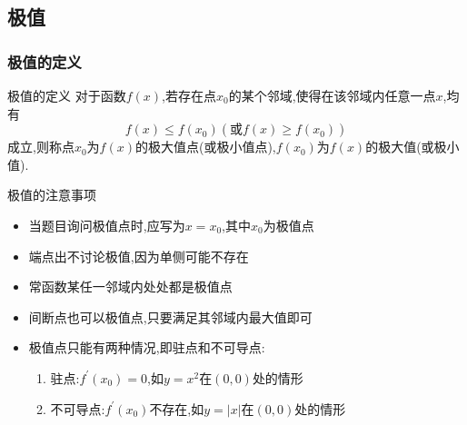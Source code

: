 \documentclass[8pt a4paper, oneside, UTF8]{ctexbook}  %
\begin{document}
\begin{sloppypar}
    \subsection{极值}
    \subsubsection{极值的定义}
    \begin{defn}{极值的定义}{}
        对于函数$f(x)$,若存在点$x_0$的某个邻域,使得在该邻域内任意一点$x$,均有
        $$
            f(x)\leqslant f(x_0)(\text{或}f(x)\geqslant f(x_0))
        $$
        成立,则称点$x_0$为$f(x)$的极大值点(或极小值点),$f(x_0)$为$f(x)$的极大值(或极小值).
    \end{defn}
    \begin{criterion}{极值的注意事项}{}
        \begin{itemize}
            \item 当题目询问极值点时,应写为$x=x_0$,其中$x_0$为极值点
            \item 端点出不讨论极值,因为单侧可能不存在
            \item 常函数某任一邻域内处处都是极值点
            \item 间断点也可以极值点,只要满足其邻域内最大值即可
            \item 极值点只能有两种情况,即驻点和不可导点:
                  \begin{enumerate}
                      \item 驻点:$f^{\prime}(x_{0})=0$,如$y=x^{2}$在$(0,0)$处的情形
                      \item 不可导点:$f^{\prime}(x_{0})$不存在,如$y=\left|x\right|$在$(0,0)$处的情形
                  \end{enumerate}
        \end{itemize}
    \end{criterion}

\end{sloppypar}
\end{document}
